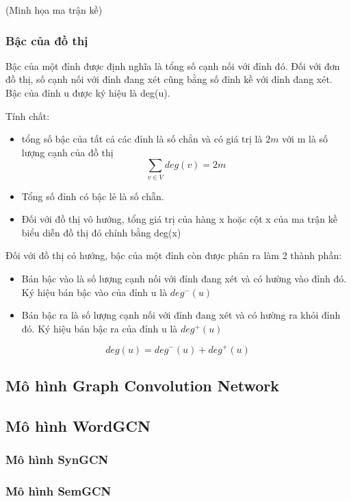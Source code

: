 (Minh họa ma trận kề)

\subsubsection{Bậc của đồ thị}

Bậc của một đỉnh được định nghĩa là tổng số cạnh nối với đỉnh đó. Đối với đơn đồ thị, số cạnh nối với đỉnh đang xét cũng bằng số đỉnh kề với đỉnh đang xét. Bậc của đỉnh u được ký hiệu là deg(u).

Tính chất:
\begin{itemize}
	\item tổng số bậc của tất cả các đỉnh là số chẳn và có giá trị là $2m$ với m là số lượng cạnh của đồ thị
	\begin{equation*}
		\sum_{v \in V}{deg(v)} = 2m
	\end{equation*}
	\item Tổng số đỉnh có bậc lẻ là số chẵn.
	\item Đối với đồ thị vô hướng, tổng giá trị của hàng x hoặc cột x của ma trận kề biểu diễn đồ thị đó chính bằng deg(x)
\end{itemize}

Đối với đồ thị có hướng, bậc của một đỉnh còn được phân ra làm 2 thành phần:
\begin{itemize}
	\item Bán bậc vào là số lượng cạnh nối với đỉnh đang xét và có hường vào đỉnh đó. Ký hiệu bán bậc vào của đỉnh u là $deg^-(u)$
	\item Bán bậc ra là số lượng cạnh nối với đỉnh đang xét và có hường ra khỏi đỉnh đó. Ký hiệu bán bậc ra của đỉnh u là $deg^+(u)$
\end{itemize}

\begin{equation*}
	deg(u) = deg^-(u) + deg^+(u)
\end{equation*}

\subsection{Mô hình Graph Convolution Network}

\subsection{Mô hình WordGCN}
\subsubsection{Mô hình SynGCN}
\subsubsection{Mô hình SemGCN}